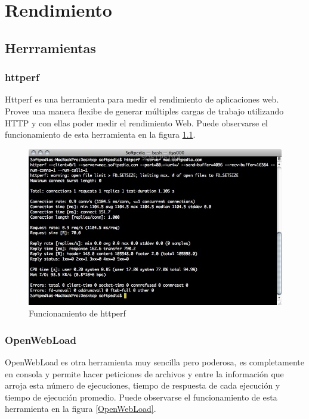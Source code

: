 
\chapter{Rendimiento} %

\label{ch:rendimiento} %


\section{Herrramientas}


\subsection{httperf}

Httperf es una herramienta para medir el rendimiento de aplicaciones web. Provee una manera flexibe de generar múltiples cargas de trabajo utilizando HTTP y con ellas poder medir el rendimiento Web. Puede observarse el funcionamiento de esta herramienta en la figura \ref{httperf}.

\begin{figure}[h]
  \centering
    \includegraphics[scale=0.4]{gfx/httperf}
  \caption{Funcionamiento de httperf}
  \label{httperf}
\end{figure}

\subsection{OpenWebLoad}
OpenWebLoad es otra herramienta muy sencilla pero poderosa, es completamente en consola y permite hacer peticiones de archivos y entre la información que arroja esta número de ejecuciones, tiempo de respuesta de cada ejecución y tiempo de ejecución promedio. Puede observarse el funcionamiento de esta herramienta en la figura \ref{OpenWebLoad}.

